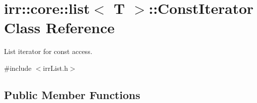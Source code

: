 \hypertarget{classirr_1_1core_1_1list_1_1ConstIterator}{}\section{irr\+:\+:core\+:\+:list$<$ T $>$\+:\+:Const\+Iterator Class Reference}
\label{classirr_1_1core_1_1list_1_1ConstIterator}


List iterator for const access.  




{\ttfamily \#include $<$irr\+List.\+h$>$}

\subsection*{Public Member Functions}
